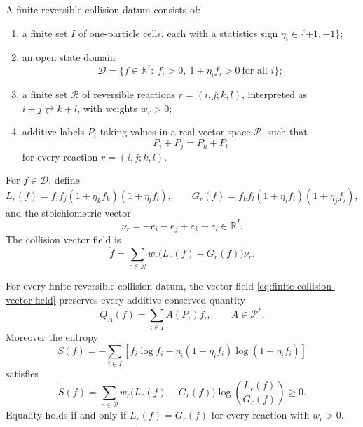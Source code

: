 \begin{definition}
\label{def:finite-reversible-collision-datum}
A finite reversible collision datum consists of:
\begin{enumerate}
\item a finite set \(I\) of one-particle cells, each with a statistics sign
  \(\eta_i\in\{+1,-1\}\);
\item an open state domain
  \[
    \mathcal D
    =
    \{f\in\mathbb R^I:\ f_i>0,\ 1+\eta_i f_i>0\ \text{for all }i\};
  \]
\item a finite set \(\mathcal R\) of reversible reactions
  \(r=(i,j;k,l)\), interpreted as \(i+j\rightleftarrows k+l\), with weights
  \(w_r>0\);
\item additive labels \(P_i\) taking values in a real vector space
  \(\mathcal P\), such that
  \begin{equation}
    P_i+P_j=P_k+P_l
    \label{eq:finite-collision-additive-conservation}
  \end{equation}
  for every reaction \(r=(i,j;k,l)\).
\end{enumerate}
For \(f\in\mathcal D\), define
\begin{equation}
  L_r(f)=f_if_j(1+\eta_k f_k)(1+\eta_l f_l),
  \qquad
  G_r(f)=f_kf_l(1+\eta_i f_i)(1+\eta_j f_j),
  \label{eq:finite-collision-loss-gain-products}
\end{equation}
and the stoichiometric vector
\begin{equation}
  \nu_r=-e_i-e_j+e_k+e_l\in\mathbb R^I .
  \label{eq:finite-collision-stoichiometric-vector}
\end{equation}
The collision vector field is
\begin{equation}
  \dot f
  =
  \sum_{r\in\mathcal R}w_r\bigl(L_r(f)-G_r(f)\bigr)\nu_r .
  \label{eq:finite-collision-vector-field}
\end{equation}
\end{definition}

\begin{proposition}
\label{prop:finite-collision-conservation-h-theorem}
For every finite reversible collision datum, the vector field
\eqref{eq:finite-collision-vector-field} preserves every additive conserved
quantity
\begin{equation}
  Q_A(f)=\sum_{i\in I}A(P_i)f_i,
  \qquad A\in\mathcal P^* .
  \label{eq:finite-collision-additive-charge}
\end{equation}
Moreover the entropy
\begin{equation}
  S(f)
  =
  -\sum_{i\in I}
  \left[
    f_i\log f_i
    -\eta_i(1+\eta_if_i)\log(1+\eta_if_i)
  \right]
  \label{eq:finite-collision-entropy}
\end{equation}
satisfies
\begin{equation}
  \dot S(f)
  =
  \sum_{r\in\mathcal R}
  w_r\bigl(L_r(f)-G_r(f)\bigr)
  \log\!\left(\frac{L_r(f)}{G_r(f)}\right)
  \ge0 .
  \label{eq:finite-collision-entropy-production}
\end{equation}
Equality holds if and only if \(L_r(f)=G_r(f)\) for every reaction with
\(w_r>0\).
\end{proposition}

